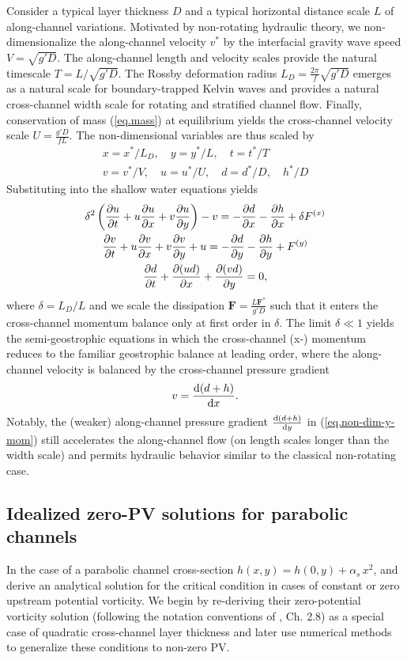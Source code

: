 \documentclass{jfm}
\begin{document}
Consider a typical layer thickness $D$ and a typical horizontal distance scale $L$ of along-channel variations. Motivated by non-rotating hydraulic theory, we non-dimensionalize the along-channel velocity $v^*$ by the interfacial gravity wave speed $V = \sqrt{g'D}$. The along-channel length and velocity scales provide the natural timescale $T = L/\sqrt{g'D}$. The Rossby deformation radius $L_{D} = \frac{2\pi}{f} \sqrt{g'D}$ emerges as a natural scale for boundary-trapped Kelvin waves and provides a natural cross-channel width scale for rotating and stratified channel flow. Finally, conservation of mass (\ref{eq.mass}) at equilibrium yields the cross-channel velocity scale $U = \frac{g'D}{fL}$. The non-dimensional variables are thus scaled by
\begin{gather}
x = x^* / L_{D}, \quad y = y^* / L, \quad t = t^* / T\\
v = v^* / V, \quad u = u^* / U, \quad d = d^* / D, \quad h^* / D
\end{gather}
Substituting into the shallow water equations yields
\begin{gather}
    \delta^2 \left( \pdv{u}{t} + u\pdv{u}{x} + v\pdv{u}{y} \right) -v = - \pdv{d}{x} - \pdv{h}{x} + \delta F^{(x)} \label{eq.non-dim-x-mom}\\
    \pdv{v}{t} + u \pdv{v}{x} + v \pdv{v}{y} + u = - \pdv{d}{y} - \pdv{h}{y} + F^{(y)}\label{eq.non-dim-y-mom} \\
    \pdv{d}{t} + \pdv{(u d)}{x} + \pdv{(v d)}{y} = 0,
\end{gather}
where $\delta = L_{D}/L$ and we scale the dissipation $\mathbf{F} = \frac{L \mathbf{F}^*}{g' D}$ such that it enters the cross-channel momentum balance only at first order in $\delta$. The limit $\delta \ll 1$ yields the semi-geostrophic equations in which the cross-channel (x-) momentum reduces to the familiar geostrophic balance at leading order, where the along-channel velocity is balanced by the cross-channel pressure gradient
\begin{equation}
    v = \dv{(d + h)}{x}.
\end{equation}
Notably, the (weaker) along-channel pressure gradient $\dv{(d + h)}{y}$ in (\ref{eq.non-dim-y-mom}) still accelerates the along-channel flow (on length scales longer than the width scale) and permits hydraulic behavior similar to the classical non-rotating case.
\subsection{Idealized zero-PV solutions for parabolic channels}
In the case of a parabolic channel cross-section $h(x,y)=h(0,y) + \alpha_{s}\, x^{2}$, \cite{Borenas1986} and \cite{borenas_deep-water_1988} derive an analytical solution for the critical condition in cases of constant or zero upstream potential vorticity. We begin by re-deriving their zero-potential vorticity solution (following the notation conventions of \citealt{Pratt2007}, Ch. 2.8) as a special case of quadratic cross-channel layer thickness and later use numerical methods to generalize these conditions to non-zero PV.
\end{document}
